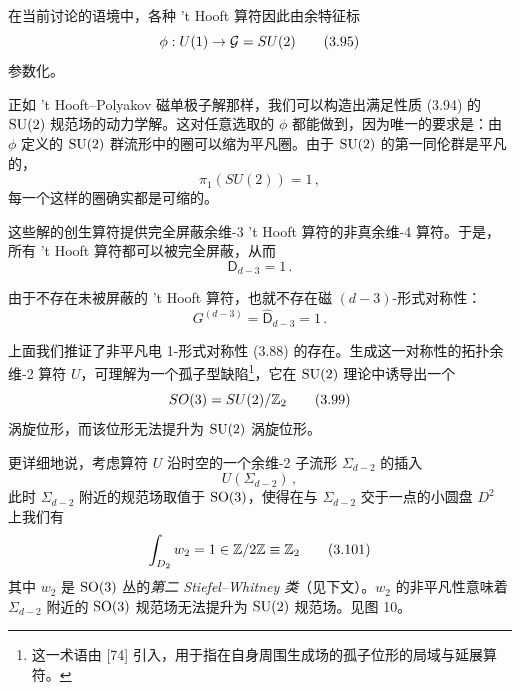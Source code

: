 在当前讨论的语境中，各种 't Hooft 算符因此由余特征标
\begin{equation}
  \phi : U(1)\to\mathcal{G}=SU(2) \tag{3.95}
\end{equation}
参数化。


 正如 't Hooft--Polyakov 磁单极子解那样，我们可以构造出满足性质 (3.94) 的 $\mathrm{SU}(2)$ 规范场的动力学解。这对任意选取的 $\phi$ 都能做到，因为唯一的要求是：由 $\phi$ 定义的 $\mathrm{SU}(2)$ 群流形中的圈可以缩为平凡圈。由于 $\mathrm{SU}(2)$ 的第一同伦群是平凡的，
\begin{equation}
  \pi_1(SU(2))=1\,, \tag{3.96}
\end{equation}
每一个这样的圈确实都是可缩的。

这些解的创生算符提供完全屏蔽余维-3 't Hooft 算符的非真余维-4 算符。于是，所有 't Hooft 算符都可以被完全屏蔽，从而
\begin{equation}
  \mathsf{D}_{d-3}=1\,. \tag{3.97}
\end{equation}

 由于不存在未被屏蔽的 't Hooft 算符，也就不存在磁 $(d-3)$-形式对称性：
\begin{equation}
  G^{(d-3)}=\widehat{\mathsf{D}}_{d-3}=1\,. \tag{3.98}
\end{equation}

 上面我们推证了非平凡电 1-形式对称性 (3.88) 的存在。生成这一对称性的拓扑余维-2 算符 $U$，可理解为一个孤子型缺陷\footnote{这一术语由 [74] 引入，用于指在自身周围生成场的孤子位形的局域与延展算符。}，它在 $\mathrm{SU}(2)$ 理论中诱导出一个
\begin{equation}
  SO(3)=SU(2)/\mathbb{Z}_2 \tag{3.99}
\end{equation}
涡旋位形，而该位形无法提升为 $\mathrm{SU}(2)$ 涡旋位形。

更详细地说，考虑算符 $U$ 沿时空的一个余维-2 子流形 $\Sigma_{d-2}$ 的插入
\begin{equation}
  U(\Sigma_{d-2})\,, \tag{3.100}
\end{equation}
此时 $\Sigma_{d-2}$ 附近的规范场取值于 $\mathrm{SO}(3)$，使得在与 $\Sigma_{d-2}$ 交于一点的小圆盘 $D^2$ 上我们有
\begin{equation}
  \int_{D_2}w_2=1\in\mathbb{Z}/2\mathbb{Z}\equiv\mathbb{Z}_2 \tag{3.101}
\end{equation}
其中 $w_2$ 是 $\mathrm{SO}(3)$ 丛的\emph{第二 Stiefel--Whitney 类}（见下文）。$w_2$ 的非平凡性意味着 $\Sigma_{d-2}$ 附近的 $\mathrm{SO}(3)$ 规范场无法提升为 $\mathrm{SU}(2)$ 规范场。见图 10。

